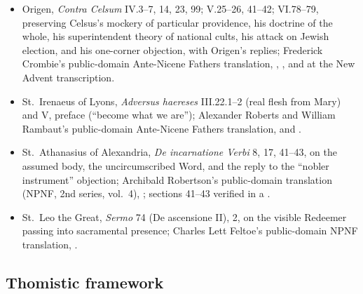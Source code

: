 {\fontsize{8.6}{9.6}\selectfont
\begin{itemize}[itemsep=0pt,parsep=0pt,topsep=0.05em]
\item Origen, \emph{Contra Celsum} IV.3--7, 14, 23, 99; V.25--26, 41--42; VI.78--79, preserving Celsus's mockery of particular providence, his doctrine of the whole, his superintendent theory of national cults, his attack on Jewish election, and his one-corner objection, with Origen's replies; Frederick Crombie's public-domain Ante-Nicene Fathers translation, , , and  at the New Advent transcription.
\item St.~Irenaeus of Lyons, \emph{Adversus haereses} III.22.1--2 (real flesh from Mary) and V, preface (``become what we are''); Alexander Roberts and William Rambaut's public-domain Ante-Nicene Fathers translation,  and .
\item St.~Athanasius of Alexandria, \emph{De incarnatione Verbi} 8, 17, 41--43, on the assumed body, the uncircumscribed Word, and the reply to the ``nobler instrument'' objection; Archibald Robertson's public-domain translation (NPNF, 2nd series, vol.~4), ; sections 41--43 verified in a .
\item St.~Leo the Great, \emph{Sermo} 74 (De ascensione II), 2, on the visible Redeemer passing into sacramental presence; Charles Lett Feltoe's public-domain NPNF translation, .
\end{itemize}}

\subsection*{Thomistic framework}

